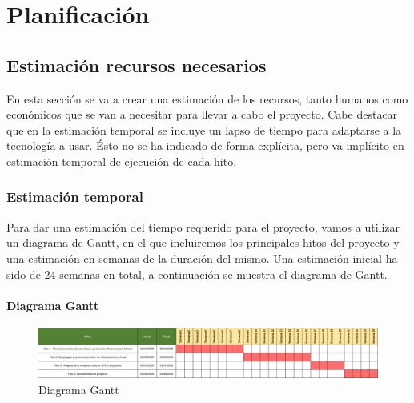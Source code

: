 \chapter {Planificación}

\section{Estimación recursos necesarios}
\begin{text}
	En esta sección se va a crear una estimación de los recursos, tanto humanos como económicos que se van a necesitar para llevar a cabo el proyecto. Cabe destacar que en la estimación temporal se incluye un lapso de tiempo para adaptarse a la tecnología a usar. Ésto no se ha indicado de forma explícita, pero va implícito en estimación temporal de ejecución de cada hito. \\ 
	
\end{text}
\subsection{Estimación temporal}
\begin{text}
	Para dar una estimación del tiempo requerido para el proyecto, vamos a utilizar un diagrama de Gantt, en el que incluiremos los principales hitos del proyecto y una estimación en semanas de la duración del mismo. Una estimación inicial ha sido de 24 semanas en total, a continuación se muestra el diagrama de Gantt.
\end{text}

\newpage
\subsubsection{Diagrama Gantt}
	\begin{figure}[!hbt]
		\centering
		\includegraphics[scale=0.4,angle=-90]{imagenes/Planificacion/gantt.jpg}
		\caption[Diagrama Gantt]{Diagrama Gantt \cite{Gantt:online}} 
		\label{Diagrama Gannt}
	\end{figure}
\clearpage
